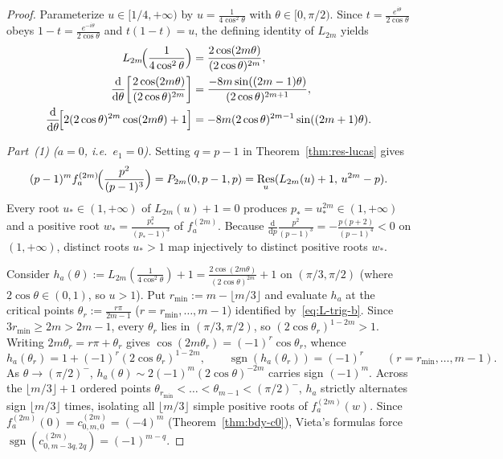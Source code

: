 \documentclass[10pt]{article}
\numberwithin{equation}{section}
\theoremstyle{plain}
\theoremstyle{definition}
\newcommand{\dd}{\mathrm{d}}
\newcommand{\1}{\mathbf{1}}
\DeclareMathOperator{\sgn}{sgn}
\DeclareMathOperator{\Res}{Res}
\begin{document}
\begin{proof}
Parameterize $u \in [1/4, +\infty)$ by $u = \frac{1}{4\cos^2\theta}$ with $\theta \in [0, \pi/2)$. Since $t = \frac{e^{i\theta}}{2\cos\theta}$ obeys $1 - t = \frac{e^{-i\theta}}{2\cos\theta}$ and $t(1 - t) = u$, the defining identity of $L_{2m}$ yields
\begin{subequations}\label{eq:L-trig}
\begin{align}
L_{2m}\!\Bigl(\frac{1}{4\cos^2\theta}\Bigr) &= \frac{2\cos(2m\theta)}{(2\cos\theta)^{2m}}, \label{eq:L-trig-a} \\
\frac{\dd}{\dd\theta}\!\left[\frac{2\cos(2m\theta)}{(2\cos\theta)^{2m}}\right] &= \frac{-8m\sin((2m - 1)\theta)}{(2\cos\theta)^{2m+1}}, \label{eq:L-trig-b} \\
\frac{\dd}{\dd\theta}\!\Bigl[2(2\cos\theta)^{2m}\cos(2m\theta) + 1\Bigr] &= -8m(2\cos\theta)^{2m-1}\sin((2m + 1)\theta). \label{eq:L-trig-c}
\end{align}
\end{subequations}

\emph{Part~(1) ($a = 0$, i.e.\ $e_1 = 0$).} Setting $q = p - 1$ in Theorem~\ref{thm:res-lucas} gives
\[
(p - 1)^m f_a^{(2m)}\!\Bigl(\frac{p^2}{(p - 1)^3}\Bigr) = P_{2m}(0, p - 1, p) = \Res_u(L_{2m}(u) + 1,\, u^{2m} - p).
\]
Every root $u_* \in (1, +\infty)$ of $L_{2m}(u) + 1 = 0$ produces $p_* = u_*^{2m} \in (1, +\infty)$ and a positive root $w_* = \frac{p_*^2}{(p_* - 1)^3}$ of $f_a^{(2m)}$. Because $\frac{\dd}{\dd p}\frac{p^2}{(p-1)^3} = -\frac{p(p+2)}{(p-1)^4} < 0$ on $(1, +\infty)$, distinct roots $u_* > 1$ map injectively to distinct positive roots $w_*$.

Consider $h_a(\theta) := L_{2m}(\frac{1}{4\cos^2\theta}) + 1 = \frac{2\cos(2m\theta)}{(2\cos\theta)^{2m}} + 1$ on $(\pi/3, \pi/2)$ (where $2\cos\theta \in (0, 1)$, so $u > 1$). Put $r_{\min} := m - \lfloor m/3 \rfloor$ and evaluate $h_a$ at the critical points $\theta_r := \frac{r\pi}{2m - 1}$ ($r = r_{\min}, \dots, m - 1$) identified by~\eqref{eq:L-trig-b}. Since $3 r_{\min} \ge 2m > 2m - 1$, every $\theta_r$ lies in $(\pi/3, \pi/2)$, so $(2\cos\theta_r)^{1-2m} > 1$. Writing $2m\theta_r = r\pi + \theta_r$ gives $\cos(2m\theta_r) = (-1)^r\cos\theta_r$, whence
\[
h_a(\theta_r) = 1 + (-1)^r (2\cos\theta_r)^{1-2m}, \qquad \sgn(h_a(\theta_r)) = (-1)^r \qquad (r = r_{\min}, \dots, m - 1).
\]
As $\theta \to (\pi/2)^-$, $h_a(\theta) \sim 2(-1)^m(2\cos\theta)^{-2m}$ carries sign $(-1)^m$. Across the $\lfloor m/3 \rfloor + 1$ ordered points $\theta_{r_{\min}} < \dots < \theta_{m-1} < (\pi/2)^-$, $h_a$ strictly alternates sign $\lfloor m/3 \rfloor$ times, isolating all $\lfloor m/3 \rfloor$ simple positive roots of $f_a^{(2m)}(w)$. Since $f_a^{(2m)}(0) = c_{0, m, 0}^{(2m)} = (-4)^m$ (Theorem~\ref{thm:bdy-c0}), Vieta's formulas force $\sgn(c_{0, m-3q, 2q}^{(2m)}) = (-1)^{m-q}$.


\end{proof}
\end{document}
